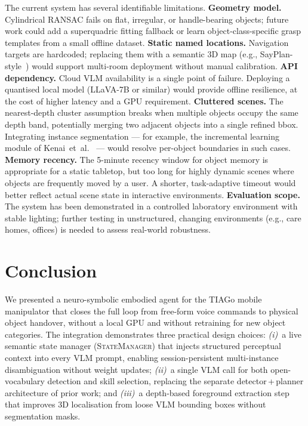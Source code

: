 \documentclass[twocolumn,10pt]{article}
\newcommand{\SM}{\textsc{StateManager}}
\begin{document}
The current system has several identifiable limitations.
\textbf{Geometry model.}
Cylindrical RANSAC fails on flat, irregular, or handle-bearing objects;
future work could add a superquadric fitting fallback or learn
object-class-specific grasp templates from a small offline dataset.
\textbf{Static named locations.}
Navigation targets are hardcoded; replacing them with a semantic 3D map
(e.g., SayPlan-style~\cite{rana2023sayplan}) would support multi-room
deployment without manual calibration.
\textbf{API dependency.}
Cloud VLM availability is a single point of failure.
Deploying a quantised local model (LLaVA-7B or similar) would provide
offline resilience, at the cost of higher latency and a GPU requirement.
\textbf{Cluttered scenes.}
The nearest-depth cluster assumption breaks when multiple objects occupy
the same depth band, potentially merging two adjacent objects into a single
refined bbox. Integrating instance segmentation — for example, the incremental
learning module of Kenai~et~al.~\cite{kenai2025neuro} — would resolve
per-object boundaries in such cases.
\textbf{Memory recency.}
The 5-minute recency window for object memory is appropriate for a static
tabletop, but too long for highly dynamic scenes where objects are frequently
moved by a user. A shorter, task-adaptive timeout would better reflect actual
scene state in interactive environments.
\textbf{Evaluation scope.}
The system has been demonstrated in a controlled laboratory environment with
stable lighting; further testing in unstructured, changing environments
(e.g., care homes, offices) is needed to assess real-world robustness.

\section{Conclusion}
\label{sec:conclusion}

We presented a neuro-symbolic embodied agent for the TIAGo mobile
manipulator that closes the full loop from free-form voice commands to
physical object handover, without a local GPU and without retraining
for new object categories.
The integration demonstrates three practical design choices:
\textit{(i)}~a live semantic state manager (\SM{}) that injects structured
perceptual context into every VLM prompt, enabling session-persistent
multi-instance disambiguation without weight updates;
\textit{(ii)}~a single VLM call for both open-vocabulary detection and
skill selection, replacing the separate detector\,+\,planner architecture
of prior work;
and \textit{(iii)}~a depth-based foreground extraction step that improves
3D localisation from loose VLM bounding boxes without segmentation masks.
\end{document}
